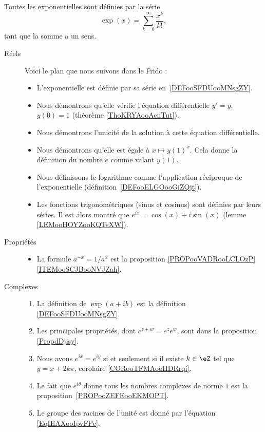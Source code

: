 
        \label{THEMEooKXSGooCsQNoY}

Toutes les exponentielles sont définies par la série
\begin{equation*}
	\exp(x)=\sum_{k=0}^{\infty}\frac{ x^k }{ k! },
\end{equation*}
tant que la somme a un sens.

\begin{description}
	\item[Réels]

	      Voici le plan que nous suivons dans le Frido :
	      \begin{itemize}
		      \item L'exponentielle est définie par sa série en~\ref{DEFooSFDUooMNsgZY}.
		      \item Nous démontrons qu'elle vérifie l'équation différentielle \( y'=y\), \( y(0)=1\) (théorème \ref{ThoKRYAooAcnTut}).
		      \item Nous démontrons l'unicité de la solution à cette équation différentielle.
		      \item Nous démontrons qu'elle est égale à \( x\mapsto y(1)^x\). Cela donne la définition du nombre \( e\) comme valant \( y(1)\).
		      \item Nous définissons le logarithme comme l'application réciproque de l'exponentielle (définition~\ref{DEFooELGOooGiZQjt}).
		      \item Les fonctions trigonométriques (sinus et cosinus) sont définies par leurs séries. Il est alors montré que \( e^{ix}=\cos(x)+i\sin(x)\) (lemme \ref{LEMooHOYZooKQTsXW}).
	      \end{itemize}

	\item[Propriétés]
	      \begin{itemize}
		      \item
		            La formule \( a^{-x}=1/a^x\) est la proposition \ref{PROPooVADRooLCLOzP}\ref{ITEMooSCJBooNVJZah}.
	      \end{itemize}

	\item[Complexes]

	      \begin{enumerate}
		      \item
		            La définition de \( \exp(a+ib)\) est la définition \ref{DEFooSFDUooMNsgZY}.
		      \item
		            Les principales propriétés, dont \(  e^{z+w}= e^{z} e^{w}\), sont dans la proposition \ref{PropdDjisy}.
		      \item
		            Nous avons \(  e^{ix}= e^{iy}\) si et seulement si il existe \( k\in\eZ\) tel que \( y=x+2k\pi\), corolaire \ref{CORooTFMAooHDRrqi}.
		      \item
		            Le fait que \(  e^{i\theta}\) donne tous les nombres complexes de norme \( 1\) est la proposition~\ref{PROPooZEFEooEKMOPT}.
		      \item
		            Le groupe des racines de l'unité est donné par l'équation \eqref{EqIEAXooIpvFPe}.
	      \end{enumerate}


\end{description}
